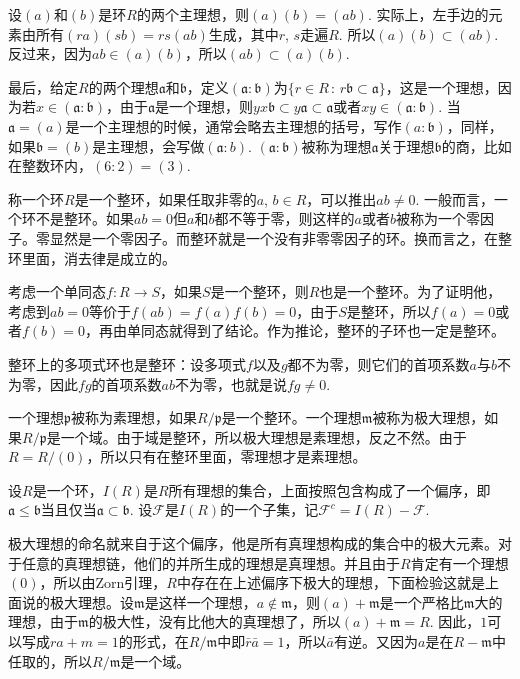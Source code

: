 设$(a)$和$(b)$是环$R$的两个主理想，则$(a)(b)=(ab)$. 实际上，左手边的元素由所有$(ra)(sb)=rs(ab)$生成，其中$r$, $s$走遍$R$. 所以$(a)(b)\subset (ab)$. 反过来，因为$ab\in (a)(b)$，所以$(ab)\subset (a)(b)$.

最后，给定$R$的两个理想$\mathfrak{a}$和$\mathfrak{b}$，定义$(\mathfrak{a}:\mathfrak{b})$为$\{r\in R\,:\, r\mathfrak{b}\subset \mathfrak{a}\}$，这是一个理想，因为若$x\in (\mathfrak{a}:\mathfrak{b})$，由于$\mathfrak{a}$是一个理想，则$yx\mathfrak{b}\subset y\mathfrak{a}\subset \mathfrak{a}$或者$xy\in (\mathfrak{a}:\mathfrak{b})$. 当$\mathfrak{a}=(a)$是一个主理想的时候，通常会略去主理想的括号，写作$(a:\mathfrak{b})$，同样，如果$\mathfrak{b}=(b)$是主理想，会写做$(\mathfrak{a}:b)$. $(\mathfrak{a}:\mathfrak{b})$被称为理想$\mathfrak{a}$关于理想$\mathfrak{b}$的商，比如在整数环内，$(6:2)=(3)$.

\para 称一个环$R$是一个整环，如果任取非零的$a$, $b\in R$，可以推出$ab\neq 0$. 一般而言，一个环不是整环。如果$ab=0$但$a$和$b$都不等于零，则这样的$a$或者$b$被称为一个零因子。零显然是一个零因子。而整环就是一个没有非零零因子的环。换而言之，在整环里面，消去律是成立的。

考虑一个单同态$f:R\to S$，如果$S$是一个整环，则$R$也是一个整环。为了证明他，考虑到$ab=0$等价于$f(ab)=f(a)f(b)=0$，由于$S$是整环，所以$f(a)=0$或者$f(b)=0$，再由单同态就得到了结论。作为推论，整环的子环也一定是整环。

整环上的多项式环也是整环：设多项式$f$以及$g$都不为零，则它们的首项系数$a$与$b$不为零，因此$fg$的首项系数$ab$不为零，也就是说$fg\neq 0$.

\para 一个理想$\mathfrak{p}$被称为素理想，如果$R/\mathfrak{p}$是一个整环。一个理想$\mathfrak{m}$被称为极大理想，如果$R/\mathfrak{p}$是一个域。由于域是整环，所以极大理想是素理想，反之不然。由于$R=R/(0)$，所以只有在整环里面，零理想才是素理想。

\para 设$R$是一个环，$I(R)$是$R$所有理想的集合，上面按照包含构成了一个偏序，即$\mathfrak{a}\leq \mathfrak{b}$当且仅当$\mathfrak{a}\subset \mathfrak{b}$. 设$\mathcal{F}$是$I(R)$的一个子集，记$\mathcal{F}^c=I(R)-\mathcal{F}$.

极大理想的命名就来自于这个偏序，他是所有真理想构成的集合中的极大元素。对于任意的真理想链，他们的并所生成的理想是真理想。并且由于$R$肯定有一个理想$(0)$，所以由Zorn引理，$R$中存在在上述偏序下极大的理想，下面检验这就是上面说的极大理想。设$\mathfrak{m}$是这样一个理想，$a\notin \mathfrak{m}$，则$(a)+\mathfrak{m}$是一个严格比$\mathfrak{m}$大的理想，由于$\mathfrak{m}$的极大性，没有比他大的真理想了，所以$(a)+\mathfrak{m}=R$. 因此，$1$可以写成$ra+m=1$的形式，在$R/\mathfrak{m}$中即$\bar{r}\bar{a}=1$，所以$\bar{a}$有逆。又因为$a$是在$R-\mathfrak{m}$中任取的，所以$R/\mathfrak{m}$是一个域。

